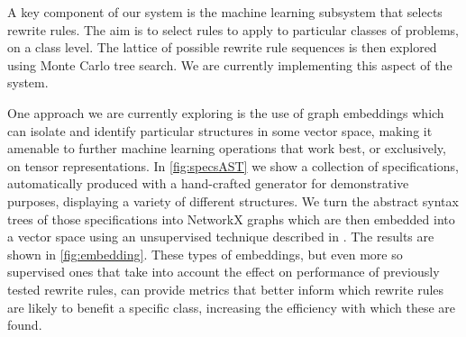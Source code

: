 \documentclass[a4paper,UKenglish,cleveref, autoref,pdfa]{lipics-v2021}
\begin{document}
A key component of our system is the machine learning subsystem that selects rewrite rules. The aim is to select rules to apply to particular classes of problems, on a class level. The lattice of possible rewrite rule sequences is then explored using Monte Carlo tree search. We are currently implementing this aspect of the system.

One approach we are currently exploring is the use of graph embeddings which can isolate and identify particular structures in some vector space, making it amenable to further machine learning operations that work best, or exclusively, on tensor representations. In \cref{fig:specsAST} we show a collection of specifications, automatically produced with a hand-crafted generator for demonstrative purposes, displaying a variety of different structures. We turn the abstract syntax trees of those specifications into NetworkX graphs which are then embedded into a vector space using an unsupervised technique described in \cite{Rozemberczki2020:characteristic}. The results are shown in \cref{fig:embedding}. These types of embeddings, but even more so supervised ones that take into account the effect on performance of previously tested rewrite rules, can provide metrics that better inform which rewrite rules are likely to benefit a specific class, increasing the efficiency with which these are found.
\end{document}
